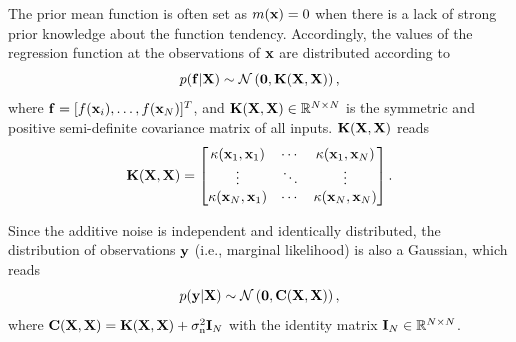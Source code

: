 \documentclass[preprint,3p]{elsarticle}
\begin{document}
\begin{linenumbers}
The prior mean function is often set as $m({\bf x})=0$ when there is a lack of strong prior knowledge about the function tendency. Accordingly, the values of the regression function at the observations of ${\bf x}$ are distributed according to
\begin{equation}
	p({\bf f}|{\bf X})\sim\mathcal{N}\left({\bf 0},{\bf K}({\bf X},{\bf X})\right),
	\label{EQ:A3}
\end{equation}
where ${\bf f} = [f({\bf x}_i),\dots,f({\bf x}_N)]^T$, and ${\bf K}({\bf X},{\bf X})\in\mathbb{R}^{N\times N}$ is the symmetric and positive semi-definite covariance matrix of all inputs. ${\bf K}({\bf X},{\bf X})$ reads
\begin{equation}
	{\bf K}({\bf X},{\bf X}) =
	\begin{bmatrix}
		\kappa({\bf x}_1,{\bf x}_1) & \cdots & \kappa({\bf x}_1,{\bf x}_N)\\
		\vdots & \ddots & \vdots\\
		\kappa({\bf x}_N,{\bf x}_1) &\cdots & \kappa({\bf x}_N,{\bf x}_N)\\
	\end{bmatrix}.
    \label{EQ:A4}
\end{equation}

Since the additive noise is independent and identically distributed, the distribution of observations ${\bf y}$ (i.e., marginal likelihood) is also a Gaussian, which reads   
\begin{equation}
	p({\bf y}|{\bf X})\sim\mathcal{N}\left({\bf 0},{\bf C}({\bf X},{\bf X})\right),
	\label{EQ:A5}
\end{equation}
where ${\bf C}({\bf X},{\bf X}) = {\bf K}({\bf X},{\bf X}) + \sigma_\text{n}^2{\bf I}_N$ with the identity matrix ${\bf I}_N\in\mathbb{R}^{N\times N}$.


\end{linenumbers}
\end{document}
